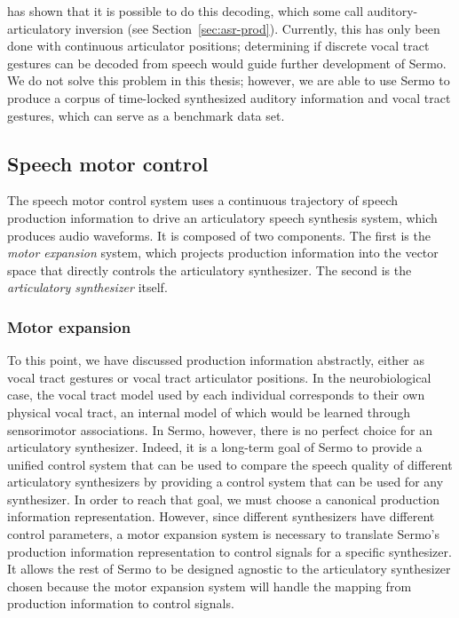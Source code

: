 \citet{uria2011} has shown that it is possible to
do this decoding,
which some call auditory-articulatory inversion
(see Section~\ref{sec:asr-prod}).
Currently, this has only been done
with continuous articulator positions;
determining if discrete vocal tract gestures
can be decoded from speech
would guide further development of Sermo.
We do not solve this problem
in this thesis;
however, we are able to use Sermo
to produce a corpus of time-locked
synthesized auditory information
and vocal tract gestures,
which can serve as a
benchmark data set.

\subsection{Speech motor control}
\label{sec:model-motorcontrol}


The speech motor control system
uses a continuous trajectory
of speech production information
to drive an articulatory
speech synthesis system,
which produces audio waveforms.
It is composed of two components.
The first is the \textit{motor expansion} system,
which projects production information
into the vector space that
directly controls the articulatory synthesizer.
The second is
the \textit{articulatory synthesizer} itself.

\subsubsection{Motor expansion}

To this point, we have discussed
production information abstractly,
either as vocal tract gestures
or vocal tract articulator positions.
In the neurobiological case,
the vocal tract model used
by each individual corresponds to
their own physical vocal tract,
an internal model of which
would be learned through
sensorimotor associations.
In Sermo, however,
there is no perfect choice
for an articulatory synthesizer.
Indeed, it is a long-term goal of Sermo
to provide a unified control system
that can be used to
compare the speech quality
of different articulatory synthesizers
by providing a control system
that can be used for any synthesizer.
In order to reach that goal,
we must choose a canonical
production information representation.
However, since different synthesizers
have different control parameters,
a motor expansion system
is necessary to translate
Sermo's production information representation
to control signals for a specific synthesizer.
It allows the rest of Sermo
to be designed agnostic
to the articulatory synthesizer chosen
because the motor expansion system
will handle the mapping
from production information
to control signals.

